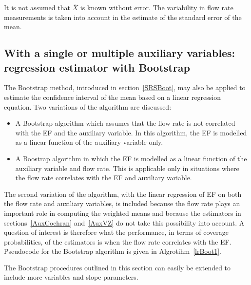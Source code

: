 It is not assumed that $\bar{X}$ is known without error. The variability in flow rate measurements is taken into account in the estimate of the standard error of the mean. %

\subsection{With a single or multiple auxiliary variables: regression estimator with Bootstrap}\label{AuxBoot}

The Bootstrap method, introduced in section~\ref{SRSBoot}, may also be applied to estimate the confidence interval of the mean based on a linear regression equation. Two variations of the algorithm are discussed:
\begin{itemize}
	\item A Bootstrap algorithm which assumes that the flow rate is not correlated with the EF and the auxiliary variable. In this algorithm, the EF is modelled as a linear function of the auxiliary variable only. 
	\item A Boostrap algorithm in which the EF is modelled as a linear function of the auxiliary variable and flow rate. This is applicable only in situations where the flow rate correlates with the EF and auxiliary variable. 
\end{itemize}
The second variation of the algorithm, with the linear regression of EF on both the flow rate and auxiliary variables, is included because the flow rate plays an important role in computing the weighted means and because the estimators in sections~\ref{AuxCochran} and~\ref{AuxVZ} do not take this possibility into account. A question of interest is therefore what the performance, in terms of coverage probabilities, of the estimators is when the flow rate correlates with the EF.
Pseudocode for the Bootstrap algorithm is given in Algrotihm~\ref{lrBoot1}.

The Bootstrap procedures outlined in this section can easily be extended to include more variables and slope parameters.

